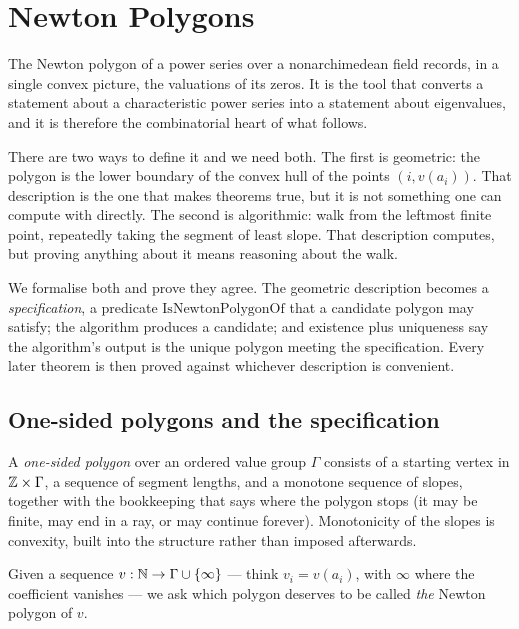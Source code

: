 \chapter{Newton Polygons}
\label{chap:np}

The Newton polygon of a power series over a nonarchimedean field records, in a single convex
picture, the valuations of its zeros.  It is the tool that converts a statement about a
characteristic power series into a statement about eigenvalues, and it is therefore the
combinatorial heart of what follows.

There are two ways to define it and we need both.  The first is geometric: the polygon is the
lower boundary of the convex hull of the points $(i, v(a_i))$.  That description is the one that
makes theorems true, but it is not something one can compute with directly.  The second is
algorithmic: walk from the leftmost finite point, repeatedly taking the segment of least slope.
That description computes, but proving anything about it means reasoning about the walk.

We formalise both and prove they agree.  The geometric description becomes a
\emph{specification}, a predicate $\mathrm{IsNewtonPolygonOf}$ that a candidate polygon may
satisfy; the algorithm produces a candidate; and existence plus uniqueness say the algorithm's
output is the unique polygon meeting the specification.  Every later theorem is then proved
against whichever description is convenient.

\section{One-sided polygons and the specification}

\begin{definition}
  \label{def:newtonpolygon0}
  \leanok
  A \emph{one-sided polygon} over an ordered value group $\Gamma$ consists of a starting vertex
  in $\mathbb{Z} \times \Gamma$, a sequence of segment lengths, and a monotone sequence of slopes,
  together with the bookkeeping that says where the polygon stops (it may be finite, may end in a
  ray, or may continue forever).  Monotonicity of the slopes is convexity, built into the
  structure rather than imposed afterwards.
\end{definition}

Given a sequence $v : \mathbb{N} \to \Gamma \cup \{\infty\}$ — think $v_i = v(a_i)$, with $\infty$ where
the coefficient vanishes — we ask which polygon deserves to be called \emph{the} Newton polygon of
$v$.

